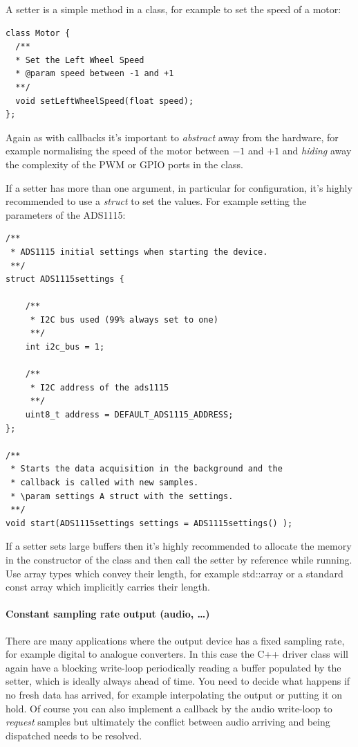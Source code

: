 \documentclass[12pt]{report}
\begin{document}
A setter is a simple method in a class, for example to set the
speed of a motor:
\begin{verbatim}
class Motor {
  /**
  * Set the Left Wheel Speed
  * @param speed between -1 and +1
  **/
  void setLeftWheelSpeed(float speed);
};
\end{verbatim}
Again as with callbacks it's important to \textsl{abstract} away from the
hardware, for example normalising the speed of the
motor between $-1$ and $+1$ and \textsl{hiding} away the complexity of the
PWM or GPIO ports in the class.

If a setter has more than one argument, in particular for
configuration, it's highly recommended to use a \textsl{struct} to set
the values. For example setting the parameters of the ADS1115:
\begin{verbatim}
/**
 * ADS1115 initial settings when starting the device.
 **/
struct ADS1115settings {

	/**
	 * I2C bus used (99% always set to one)
	 **/
	int i2c_bus = 1;

	/**
	 * I2C address of the ads1115
	 **/
	uint8_t address = DEFAULT_ADS1115_ADDRESS;
};

/**
 * Starts the data acquisition in the background and the
 * callback is called with new samples.
 * \param settings A struct with the settings.
 **/
void start(ADS1115settings settings = ADS1115settings() );
\end{verbatim}

If a setter sets large buffers then it's highly recommended
to allocate the memory in the constructor of the class and then call the setter by reference
while running. Use array types which convey their length, for example
std::array or a standard const array which implicitly carries their length.

\paragraph{Constant sampling rate output (audio, \ldots)}
There are many applications where the output device has a fixed
sampling rate, for example digital to analogue converters.  In this
case the C++ driver class will again have a blocking write-loop
periodically reading a buffer populated by the setter, which is
ideally always ahead of time.
You need to decide what happens if no
fresh data has arrived, for example interpolating the output or
putting it on hold. Of course you can also implement a callback by the
audio write-loop to \textsl{request} samples but ultimately
the conflict between audio arriving and being dispatched needs to be
resolved.
\end{document}
